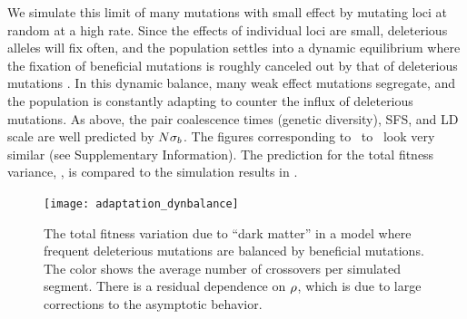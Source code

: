 We simulate this limit of many mutations with small effect by mutating
loci at random at a high rate. Since the effects of individual loci are
small, deleterious alleles will fix often, and the population settles into
a dynamic equilibrium where the fixation of beneficial mutations is roughly canceled out
by that of deleterious mutations \cite{Goyal:2012p47382}. In this dynamic
balance, many weak effect mutations segregate, and the population is
constantly adapting to counter the influx of deleterious mutations.  As
above, the pair coalescence times (genetic diversity), SFS,
and LD scale are well predicted by $N{\sigma_b}$. The figures
corresponding to \FigTtwo~to \FigLD~look very similar (see Supplementary
Information). The prediction for the total fitness variance,
, is compared to the simulation results in
\FigAda.


\begin{figure}
  \centering
  \texttt{[image: adaptation\_dynbalance]}
  \caption{The total fitness variation due to ``dark matter'' in a model
    where frequent deleterious mutations are balanced by beneficial mutations. The
    color shows the average number of crossovers per simulated
    segment. There is a residual dependence on $\rho$, which is due to
    large corrections to the asymptotic behavior.}
  \label{fig:adaptation_dynbalance}
\end{figure}




